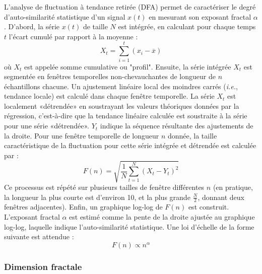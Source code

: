 L'analyse de fluctuation à tendance retirée (DFA) permet de caractériser le degré d'auto-similarité statistique d'un signal $x(t)$ en mesurant son exposant fractal $\alpha$ \citep{peng1993long}. 
D'abord, la série $x(t)$ de taille $N$ est intégrée, en calculant pour chaque temps $t$ l'écart cumulé par rapport à la moyenne :
\begin{equation}
X_t = \sum_{i=1}^t (x_i - \overline{x})
\end{equation}
où $X_t$ est appelée somme cumulative ou "profil". 
Ensuite, la série intégrée $X_t$ est segmentée en fenêtres temporelles non-chevauchantes de longueur de $n$ échantillons chacune. 
Un ajustement linéaire local des moindres carrés (\textit{i.e.}, tendance locale) est calculé dans chaque fenêtre temporelle. 
La série $X_t$ est localement «détrendée» en soustrayant les valeurs théoriques données par la régression, c'est-à-dire que la tendance linéaire calculée est soustraite à la série pour une série «détrendée». 
$Y_t$ indique la séquence résultante des ajustements de la droite.
Pour une fenêtre temporelle de longueur $n$ donnée, la taille caractéristique de la fluctuation pour cette série intégrée et détrendée est calculée par :
\begin{equation}
F(n) = \sqrt{\frac{1}{N} \sum_{t=1}^N (X_t - Y_t)^2}
\end{equation}
Ce processus est répété sur plusieurs tailles de fenêtre différentes $n$ (en pratique, la longueur la plus courte est d'environ 10, et la plus grande $\frac{N}{2}$, donnant deux fenêtres adjacentes). 
Enfin, un graphique log-log de $F(n)$ est construit. 
L'exposant fractal $\alpha$ est estimé comme la pente de la droite ajustée au graphique log-log, laquelle indique l'auto-similarité statistique. 
Une loi d'échelle de la forme suivante est attendue : 
\begin{equation}
F(n) \propto n^\alpha
\end{equation}

\subsubsection*{Dimension fractale}


